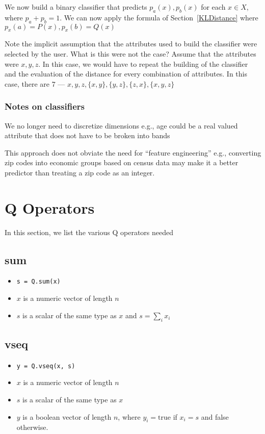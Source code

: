 We now build a binary classifier that predicts \(p_a(x), p_b(x)\) for each \(x \in
X\), where \(p_a + p_b = 1\). We can now apply the formula of
Section~\ref{KLDistance} where \(p_x(a) = P(x), p_x(b) = Q(x)\)

Note the implicit assumption that the attributes used to build 
the classifier were selected by the user. What is this were not the case? Assume
that the attributes were \(x, y, z\). In this case, we would have to repeat the
building of the classifier and the evaluation of the distance for every
combination of attributes. In this case, there are 7 
--- \(x, y, z, \{x, y\}, \{y, z\}, \{z, x\}, \{x, y, z\}\)


\subsubsection{Notes on classifiers}
\be
\item We no longer need to discretize dimensions e.g., age could be a real
valued attribute that does not have to be broken into bands
\item This approach does not obviate the need for ``feature engineering'' e.g.,
converting zip codes into economic groups based on census data may make it a
better predictor than treating a zip code as an integer.
\ee

\section{Q Operators}

In this section, we list the various Q operators needed

\subsection{sum}
\label{sum}

\begin{itemize}
\item \verb+s = Q.sum(x)+ 
\item \(x\) is a numeric vector of length \(n\)
\item \(s\) is a scalar of the same type as \(x\) and \(s = \sum_i x_i\)
\end{itemize}

\subsection{vseq}
\label{vseq}

\begin{itemize}
\item \verb+y = Q.vseq(x, s)+ 
\item \(x\) is a numeric vector of length \(n\)
\item \(s\) is a scalar of the same type as \(x\)
\item \(y\) is a boolean vector of length \(n\), where \(y_i = \mathrm{true}\)
if \(x_i = s\) and false otherwise.
\end{itemize}

